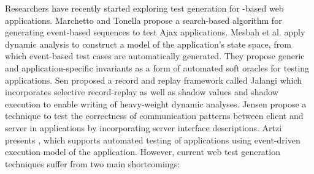 Researchers have recently started exploring test generation for \javascript-based web applications.
Marchetto and Tonella \cite{marchetto:search} propose a search-based algorithm for generating event-based sequences to test Ajax applications. 
Mesbah et al.  \cite{mesbah:tweb11} apply dynamic analysis to construct a model of the application's state space, from which event-based test cases are automatically generated. They propose \cite{mesbah:tse12} generic and application-specific invariants as a form of automated soft oracles for testing \ajax applications. 
Sen \etal \cite{sen:fse13} proposed a record and replay framework called Jalangi which incorporates selective record-replay as well as shadow values and shadow execution to enable writing of heavy-weight dynamic analyses. %
Jensen \etal \cite{jensen:fse13} propose a technique to test the correctness of communication patterns between client and server in \ajax applications by incorporating server interface descriptions.
Artzi \etal \cite{artzi:icse11} presents \artemis, which supports automated testing of \javascript applications using event-driven execution model of the application. %
However, current web test generation techniques suffer from two main shortcomings:
